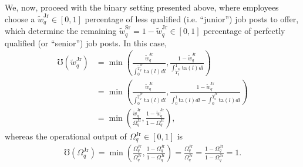 \documentclass[hidelinks, nonatbib]{elsarticle}
\begin{document}
\begin{enumerate}
    We, now, proceed with the binary setting presented above, where employees choose a $\tilde{w}_{q}^{\text{Jr}} \in [0,1]$ percentage of less qualified (i.e. ``junior'') job posts to offer, which determine the remaining $\tilde{w}_{q}^{\text{Sr}} = 1 - \tilde{w}_{q}^{\text{Jr}} \in [0,1]$ percentage of perfectly qualified (or ``senior'') job posts. In this case,
    \begin{align}
        \mho(\tilde{w}_{q}^{\text{Jr}})
        &=
        \min\left(
            \frac{
                \tilde{w}_{q}^{\text{Jr}}
            }{
                \int_{0}^{
                    \tilde{T}_{q}^{\text{Jr}}
                }{
                    \text{ta}(l)
                    dl
                }
            }
            ,
            \frac{
                1 - \tilde{w}_{q}^{\text{Jr}}
            }{
                \int_{
                    \tilde{T}_{q}^{\text{Jr}}
                }^{1}{
                    \text{ta}(l)
                    dl
                }
            }
        \right)
        \\
        &=
        \min\left(
            \frac{
                \tilde{w}_{q}^{\text{Jr}}
            }{
                \int_{0}^{
                    \tilde{T}_{q}^{\text{Jr}}
                }{
                    \text{ta}(l)
                    dl
                }
            }
            ,
            \frac{
                1 - \tilde{w}_{q}^{\text{Jr}}
            }{
                \int_{0}^{1}{
                    \text{ta}(l)
                    dl
                }
                -
                \int_{0}^{
                    \tilde{T}_{q}^{\text{Jr}}
                }{
                    \text{ta}(l)
                    dl
                }
            }
        \right)
        \\
        &=
        \min\left(
            \frac{
                \tilde{w}_{q}^{\text{Jr}}
            }{
                \Omega_{q}^{\text{Jr}}
            }
            ,
            \frac{
                1 - \tilde{w}_{q}^{\text{Jr}}
            }{
                1 - \Omega_{q}^{\text{Jr}}
            }
        \right)
        ,
    \end{align}
    whereas the operational output of $\Omega_{q}^{\text{Jr}} \in [0,1]$ is
    \begin{align}
        \mho(\Omega_{q}^{\text{Jr}}) 
        =
        \min\left(
            \frac{
                \Omega_{q}^{\text{Jr}}
            }{
                \Omega_{q}^{\text{Jr}}
            }
            ,
            \frac{
                1 - \Omega_{q}^{\text{Jr}}
            }{
                1 - \Omega_{q}^{\text{Jr}}
            }
        \right)
        =
        \frac{
            \Omega_{q}^{\text{Jr}}
        }{
            \Omega_{q}^{\text{Jr}}
        }
        =
        \frac{
            1 - \Omega_{q}^{\text{Jr}}
        }{
            1 - \Omega_{q}^{\text{Jr}}
        }
        =
        1
        .
    \end{align}


\end{enumerate}
\end{document}
